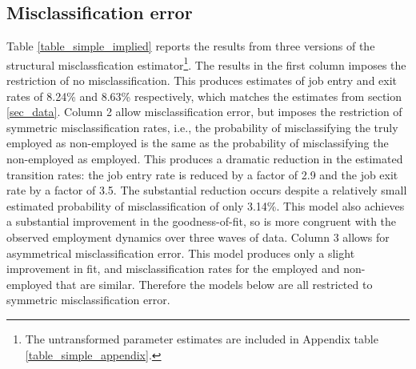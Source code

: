\documentclass[letterpaper,12pt,final,dvipsnames]{article}
\begin{document}

\subsection{Misclassification error}

Table \ref{table_simple_implied} reports the results from three versions of the structural misclassfication estimator\footnote{The untransformed parameter estimates are included in Appendix table \ref{table_simple_appendix}.}.  The results in the first column imposes the restriction of no misclassification. This produces estimates of job entry and exit rates of 8.24\% and 8.63\% respectively, which matches the estimates from section \ref{sec_data}. Column 2 allow misclassification error, but imposes the restriction of symmetric misclassification rates, i.e., the probability of misclassifying the truly employed as non-employed is the same as the probability of misclassifying the non-employed as employed. This produces a dramatic reduction in the estimated transition rates: the job entry rate is reduced by a factor of 2.9 and the job exit rate by a factor of 3.5. The substantial reduction occurs despite a relatively small estimated probability of misclassification of only 3.14\%. This model also achieves a substantial improvement in the goodness-of-fit, so is more congruent with the observed employment dynamics over three waves of data. Column 3 allows for asymmetrical misclassification error. This model produces only a slight improvement in fit, and misclassification rates for the employed and non-employed that are similar. Therefore the models below are all restricted to symmetric misclassification error.
\end{document}
